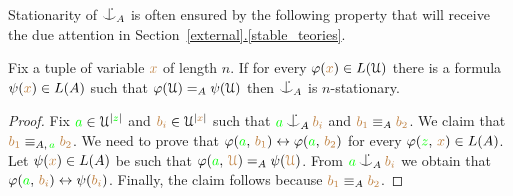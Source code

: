 \documentclass[creche.tex]{subfiles}
\begin{document}
Stationarity of $\nonforkc_A$ is often ensured by the following property that will receive the due attention in Section~\hyperref[stable_teories]{\ref*{external}.\ref*{stable_teories}}.

\begin{proposition}
Fix a tuple of variable ${\color{brown} x}$ of length $n$.
If for every $\varphi({\color{brown} x})\in L(\EuScript U)$ there is a formula $\psi({\color{brown} x})\in L(A)$ such that $\varphi(\EuScript U)=_A\psi(\EuScript U)$ then $\nonforkc_A$ is $n$-stationary.
\end{proposition}

\begin{proof}
Fix ${\color{green} a}\in\EuScript U^{|{\color{green} z}|}$ and  ${\color{brown} b_i}\in\EuScript U^{|{\color{brown} x}|}$ such that ${\gr a}\nonforkc_A{\mr b_i}$ and ${\color{brown} b_1}\equiv_A{\color{brown} b_2}$.
We claim that ${\color{brown} b_1}\equiv_{A,\,{\color{green} a}}{\color{brown} b_2}$.
We need to prove that $\varphi({\color{green} a},\,{\color{brown} b_1})\leftrightarrow\varphi({\color{green} a},\,{\color{brown} b_2})$ for every  $\varphi({\color{green} z},\,{\color{brown} x})\in L(A)$.
Let $\psi({\color{brown} x})\in L(A)$ be such that $\varphi({\color{green} a},\,{\color{brown} \EuScript U})=_A\psi({\color{brown} \EuScript U})$.
From ${\gr a}\nonforkc_A{\mr b_i}$ we obtain that  $\varphi({\color{green} a},\,{\color{brown} b_i})\leftrightarrow\psi({\color{brown} b_i})$.
Finally, the claim follows because ${\color{brown} b_1}\equiv_A{\color{brown} b_2}$.
\end{proof}



% 

\end{document}
